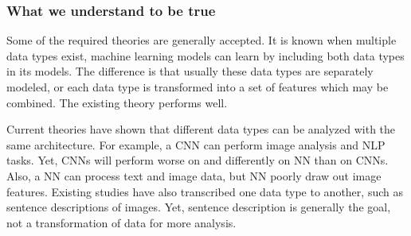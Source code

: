 \subsubsection{What we understand to be true}

Some of the required theories are generally accepted. It is known when multiple data types exist, machine learning models can learn by including both data types in its models.  The difference is that usually these data types are separately modeled, or each data type is transformed into a set of features which may be combined.  The existing theory performs well.  %

Current theories have shown that different data types can be analyzed with the same architecture.  For example, a CNN can perform image analysis and NLP tasks.  Yet, CNNs will perform worse on and differently on NN than on CNNs.  Also, a NN can process text and image data, but NN poorly draw out image features.  Existing studies have also transcribed one data type to another, such as sentence descriptions of images.  Yet, sentence description is generally the goal, not a transformation of data for more analysis. 
